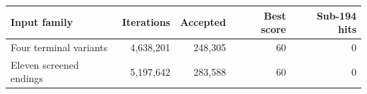 \begin{center}\small\begin{tabular}{@{}lrrrr@{}}\toprule
Input family & Iterations & Accepted & Best score & Sub-194 hits\\\midrule
Four terminal variants & 4,638,201 & 248,305 & 60 & 0\\
Eleven screened endings & 5,197,642 & 283,588 & 60 & 0\\
\bottomrule\end{tabular}\end{center}
